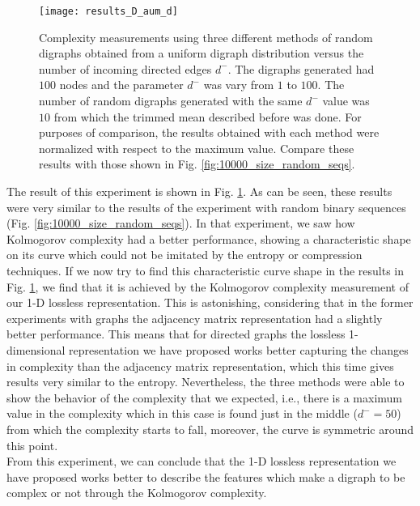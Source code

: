 \begin{figure}
\centering
\texttt{[image: results\_D\_aum\_d]}
\caption[Complexity measurements using three different methods of random digraphs obtained from a uniform digraph distribution.]{Complexity measurements using three different methods of random digraphs obtained from a uniform digraph distribution versus the number of incoming directed edges $d^{-}$. The digraphs generated had $100$ nodes and the parameter $d^{-}$ was vary from $1$ to $100$. The number of random digraphs generated with the same $d^{-}$ value was $10$ from which the trimmed mean described before was done. For purposes of comparison, the results obtained with each method were normalized with respect to the maximum value. Compare these results with those shown in Fig. \ref{fig:10000_size_random_seqs}.}
\label{fig:results_D_aum_d}
\end{figure}

The result of this experiment is shown in Fig. \ref{fig:results_D_aum_d}. As can be seen, these results were very similar to the results of the experiment with random binary sequences (Fig. \ref{fig:10000_size_random_seqs}). In that experiment, we saw how Kolmogorov complexity had a better performance, showing a characteristic shape on its curve which could not be imitated by the entropy or compression techniques. If we now try to find this characteristic curve shape in the results in Fig. \ref{fig:results_D_aum_d}, we find that it is achieved by the Kolmogorov complexity measurement of our 1-D lossless representation. This is astonishing, considering that in the former experiments with graphs the adjacency matrix representation had a slightly better performance. This means that for directed graphs the lossless 1-dimensional representation we have proposed works better capturing the changes in complexity than the adjacency matrix representation, which this time gives results very similar to the entropy. Nevertheless, the three methods were able to show the behavior of the complexity that we expected, i.e., there is a maximum value in the complexity which in this case is found just in the middle ($d^{-}=50$) from which the complexity starts to fall, moreover, the curve is symmetric around this point.\\

From this experiment, we can conclude that the 1-D lossless representation we have proposed works better to describe the features which make a digraph to be complex or not through the Kolmogorov complexity.\\

